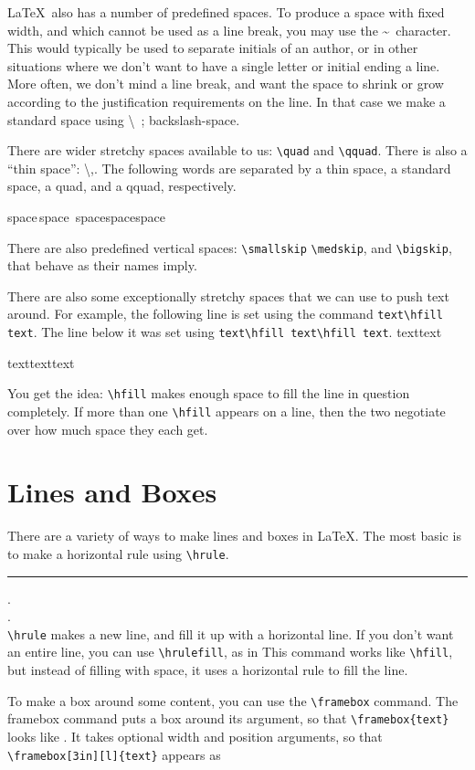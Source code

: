 \documentclass[12pt]{article}
\begin{document}
\LaTeX\ also has a number of predefined spaces. To produce a space with fixed width, and which cannot be used as a line break, you may use the \textasciitilde \ 
character. This would typically be used to separate initials of an author,
or in other situations where we don’t want to have a single letter or initial
ending a line. More often, we don’t mind a line break, and want the space
to shrink or grow according to the justification requirements on the line. In
that case we make a standard space using \textbackslash \ ; backslash-space.

There are wider stretchy spaces available to us: \verb|\quad| and \verb|\qquad|. There is also a “thin space”: \textbackslash,. The following words are separated by a thin space, a standard space, a quad, and a qquad, respectively.\\

\centerline{space\,space\ space\quad space\qquad space}

There are also predefined vertical spaces: \verb|\smallskip| \verb|\medskip|, and \verb|\bigskip|, that behave as their names imply.

There are also some exceptionally stretchy spaces that we can use to push text around. For example, the following line is set using the command \verb|text\hfill text|. The line below it was set using \verb|text\hfill text\hfill text|. text\hfill text

\noindent text\hfill text\hfill text

\noindent You get the idea: \verb|\hfill| makes enough space to fill the line in question completely. If more than one \verb|\hfill| appears on a line, then the two negotiate over how much space they each get.

\section{Lines and Boxes}
There are a variety of ways to make lines and boxes in \LaTeX. The most basic is to make a horizontal rule using \verb|\hrule|.
\hrule
.\\
.\\
\indent \verb|\hrule| makes a new line, and fill it up with a horizontal line. If you don't want an entire line, you can use \verb|\hrulefill|, as in \hrulefill This command works like \verb|\hfill|, but instead of filling with space, it uses a horizontal rule to fill the line.

To make a box around some content, you can use the \verb|\framebox| command. The framebox command puts a box around its argument, so that \verb|| looks like \framebox{text}. It takes optional width and position arguments, so that \verb|\framebox[3in][l]{text}| appears as
\end{document}
